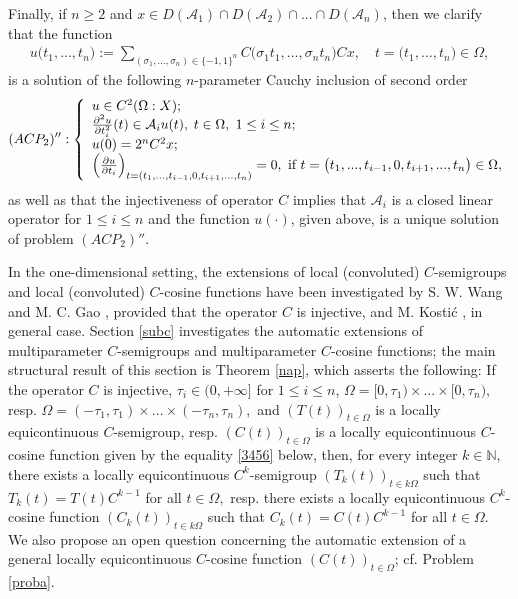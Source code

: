 \documentclass{amsart}
\theoremstyle{definition}
\theoremstyle{remark}
\numberwithin{equation}{section}
\begin{document}
Finally, if $n \geq 2$ and $x\in D({\mathcal A}_{1}) \cap D({\mathcal A}_{2}) \cap ... \cap D({\mathcal A}_{n})$, then we clarify that the function
\begin{align}
u\bigl(t_{1},..., t_{n}\bigr):=\sum_{(\sigma_{1},...,\sigma_{n}) \in \{ -1,1\}^{n}}C\bigl( \sigma_{1}t_{1},..., \sigma_{n}t_{n}\bigr)Cx,\quad t=\bigl(t_{1},..., t_{n}\bigr) \in \Omega,
\end{align}
is a solution of the following $n$-parameter Cauchy inclusion of second order
\[ (ACP_{2})'': \left\{
\begin{array}{l}
u\in C^{2}(\Omega : X);\\ \frac{\partial ^{2}u}{\partial t_{i}^{2}}(t)\in {\mathcal A}_{i}u(t),\;t \in \Omega , \ 1\le i\leq n;\\ u(0)=2^{n}C^{2}x; \\
\Bigl( \frac{\partial u}{\partial t_{i}}\Bigr)_{t=(t_{1},...,t_{i-1},0,t_{i+1},...,t_{n})}=0,\ \mbox{if }t=\bigl(t_{1},...,t_{i-1},0,t_{i+1},...,t_{n} \bigr) \in \Omega ,
\end{array}
\right. \]
as well as that the injectiveness of operator 
$C$ implies that ${\mathcal A}_{i}$ is a closed linear operator for $1\leq i \leq n$ and the function $u(\cdot)$, given above, is a unique solution of problem $(ACP_{2})''.$  

In the one-dimensional setting, the extensions of local (convoluted) $C$-semigroups and local (convoluted) $C$-cosine functions have been investigated by S. W. Wang and M. C. Gao \cite[Theorem 2.6, Theorem 3.6]{wang}, provided that the operator $C$ is injective, and M. Kosti\' c \cite[Theorem 3.2.60, Remark 3.2.61]{FKP}, in general case.  Section \ref{subc} investigates the automatic extensions of multiparameter $C$-semigroups and multiparameter $C$-cosine functions; the main structural result of this section is Theorem \ref{nap}, which asserts the following: If the operator $C$ is injective, $\tau_{i}\in (0,+\infty]$ for $1\leq i \leq n$, $\Omega =[0,\tau_{1}) \times ... \times [0,\tau_{n}),$ resp. $\Omega =(-\tau_{1},\tau_{1}) \times ... \times (-\tau_{n},\tau_{n}),$ and $(T(t))_{t\in \Omega}$ 
is a locally equicontinuous $C$-semigroup, resp. $(C(t))_{t\in \Omega}$ 
is a locally equicontinuous $C$-cosine function given by the equality \eqref{3456} below, then, for every integer $k\in {\mathbb N},$ there exists a locally equicontinuous $C^{k}$-semigroup $(T_{k}(t))_{t\in k\Omega}$ such that $T_{k}(t)=T(t)C^{k-1}$ for all $t\in \Omega,$ resp. there exists a locally equicontinuous $C^{k}$-cosine function $(C_{k}(t))_{t\in k\Omega}$ such that $C_{k}(t)=C(t)C^{k-1}$ for all $t\in \Omega.$ We also propose an open question concerning the automatic extension of a general locally equicontinuous $C$-cosine function $(C(t))_{t\in \Omega}$; cf. Problem \ref{proba}.
\end{document}
